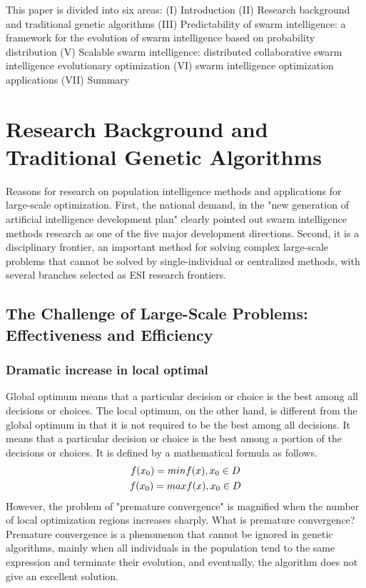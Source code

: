 \documentclass[twocolumn]{article}
\begin{document}
This paper is divided into six areas: (I) Introduction (II) Research
background and traditional genetic algorithms (III) Predictability of
swarm intelligence: a framework for the evolution of swarm intelligence
based on probability distribution (V) Scalable swarm intelligence:
distributed collaborative swarm intelligence evolutionary optimization
(VI) swarm intelligence optimization applications (VII) Summary


\section{Research Background and Traditional Genetic
	Algorithms}
Reasons for research on population intelligence methods and applications
for large-scale optimization. First, the national demand, in the "new
generation of artificial intelligence development plan" clearly pointed
out swarm intelligence methods research as one of the five major
development directions. Second, it is a disciplinary frontier, an
important method for solving complex large-scale problems that cannot be
solved by single-individual or centralized methods, with several
branches selected as ESI research frontiers.

\subsection{The Challenge of Large-Scale Problems: Effectiveness and Efficiency}

\subsubsection{Dramatic increase in local optimal}
Global optimum means that a particular decision or choice is the best
among all decisions or choices. The local optimum, on the other hand, is
different from the global optimum in that it is not required to be the
best among all decisions. It means that a particular decision or choice
is the best among a portion of the decisions or choices. It is defined
by a mathematical formula as follows.
\begin{gather}
		f(x_0) = min{f(x)},x_0 \in D \notag\\
		f(x_0) = max{f(x)},x_0 \in D \notag
\end{gather}
However, the problem of "premature convergence" is magnified when the
number of local optimization regions increases sharply. What is
premature convergence? Premature convergence is a phenomenon that cannot
be ignored in genetic algorithms, mainly when all individuals in the
population tend to the same expression and terminate their evolution,
and eventually, the algorithm does not give an excellent solution.
\end{document}
